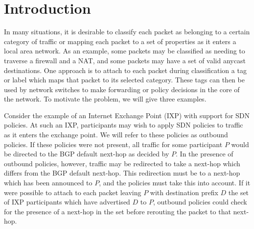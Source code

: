 \section{Introduction}
In many situations, it is desirable to classify each packet as belonging to a certain category of traffic or mapping each packet to a set of properties as it enters a local area network. As an example, some packets may be classified as needing to traverse a firewall and a NAT, and some packets may have a set of valid anycast destinations. One approach is to attach to each packet during classification a tag or label which maps that packet to its selected category. These tags can then be used by network switches to make forwarding or policy decisions in the core of the network. To motivate the problem, we will give three examples.

Consider the example of an Internet Exchange Point (IXP) with support for SDN policies. At such an IXP, participants may wish to apply SDN policies to traffic as it enters the exchange point. We will refer to these policies as outbound policies. If these policies were not present, all traffic for some participant $P$ would be directed to the BGP default next-hop as decided by $P$. In the presence of outbound policies, however, traffic may be redirected to take a next-hop which differs from the BGP default next-hop. This redirection must be to a next-hop which has been announced to $P$, and the policies must take this into account. If it were possible to attach to each packet leaving $P$ with destination prefix $D$ the set of IXP participants which have advertised $D$ to $P$, outbound policies could check for the presence of a next-hop in the set before rerouting the packet to that next-hop. 




